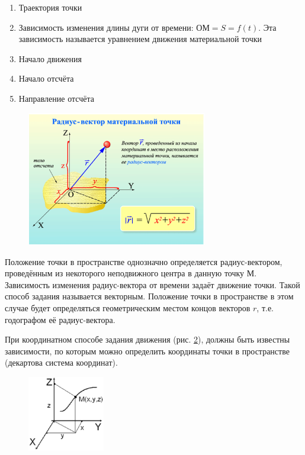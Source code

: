 \documentclass[a5paper, 10pt]{diss_4}
\renewcommand{\'}{\,'}
\begin{document}
\begin{enumerate}
  \item Траектория точки
  \item Зависимость изменения длины дуги от времени: $ОМ=S=f(t)$. Эта зависимость называется уравнением движения материальной точки
  \item Начало движения
  \item Начало отсчёта
  \item Направление отсчёта
\end{enumerate}

\begin{figure}[h]
\begin{center}
\includegraphics*[width=0.7\textwidth]{img/img02.eps}
\label{fig1}
\end{center}\end{figure}

  Положение точки в пространстве однозначно определяется радиус-вектором,
проведённым из некоторого неподвижного центра в данную точку $М$. Зависимость
изменения радиус-вектора от времени задаёт движение точки. Такой способ задания
называется векторным. Положение точки в пространстве в этом случае будет
определяться геометрическим местом концов векторов $r$, т.е. годографом её
радиус-вектора.

  При координатном способе задания движения (рис. \ref{fig5}), должны быть известны
зависимости, по которым можно определить координаты точки в пространстве
(декартова система координат).
\begin{figure}
\includegraphics[width=0.3\textwidth]{img/img05.eps}
\caption{}
\label{fig5}
\end{figure}
\end{document}
